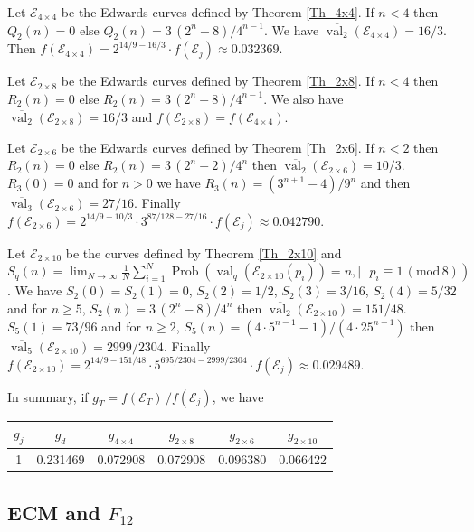 \documentclass[a4paper, 11pt, pdftex]{report}
\theoremstyle{plain}
\theoremstyle{definition}
\newcommand\T{\rule{0pt}{2.6ex}}
\newcommand\B{\rule[-1.4ex]{0pt}{0pt}}
\DeclareMathOperator{\val}{val}
\DeclareMathOperator{\Prob}{Prob}
\begin{document}
Let $\mathcal{E}_{4\times4}$ be the Edwards curves defined by Theorem \ref{Th_4x4}.
If $n < 4$ then $Q_2(n) = 0$ else $Q_2(n) = 3\,(2^n - 8)/4^{n-1}$. We have
$\overline{\val_2}(\mathcal{E}_{4\times4}) = 16/3$. Then $f(\mathcal{E}_{4\times4})
= 2^{14/9 - 16/3}\cdot f(\mathcal{E}_j) \approx 0.032369$.

Let $\mathcal{E}_{2\times8}$ be the Edwards curves defined by Theorem \ref{Th_2x8}.
If $n < 4$ then $R_2(n) = 0$ else $R_2(n) = 3\,(2^n - 8)/4^{n-1}$. We also have
$\overline{\val_2}(\mathcal{E}_{2\times8}) = 16/3$ and
$f(\mathcal{E}_{2\times8}) = f(\mathcal{E}_{4\times4})$.

Let $\mathcal{E}_{2\times6}$ be the Edwards curves defined by Theorem \ref{Th_2x6}.
If $n < 2$ then $R_2(n) = 0$ else $R_2(n) = 3\,(2^n - 2)/4^n$ then
$\overline{\val_2}(\mathcal{E}_{2\times6}) = 10/3$. $R_3(0) = 0$ and for $n > 0$
we have $R_3(n) = (3^{n+1} - 4) / 9^n$ and then $\overline{\val_3}(\mathcal{E}_{2\times6}) = 27/16$.
Finally $f(\mathcal{E}_{2\times6})
= 2^{14/9 - 10/3}\cdot 3^{87/128 - 27/16}\cdot f(\mathcal{E}_j) \approx 0.042790$.

Let $\mathcal{E}_{2\times10}$ be the curves defined by Theorem \ref{Th_2x10} and
$S_q(n) = \lim_{N \to \infty} \frac{1}{N} \sum_{i = 1}^N
\Prob(\val_q(\mathcal{E}_{2\times10}(p_i)) = n, |\text{ } p_i \equiv 1\, (\text{mod}\,8))$.
We have $S_2(0) = S_2(1) = 0$, $S_2(2) = 1/2$, $S_2(3) = 3/16$, $S_2(4) = 5/32$ and
for $n \geq 5$, $S_2(n) = 3\,(2^n - 8)/4^n$ then
$\overline{\val_2}(\mathcal{E}_{2\times10}) = 151/48$. $S_5(1) = 73/96$ and for $n \geq 2$,
$S_5(n) = (4\cdot 5^{n-1} - 1)/(4\cdot 25^{n-1})$ then
$\overline{\val_5}(\mathcal{E}_{2\times10}) = 2999/2304$.
Finally $f(\mathcal{E}_{2\times10})
= 2^{14/9 - 151/48}\cdot 5^{695/2304 - 2999/2304}\cdot f(\mathcal{E}_j) \approx 0.029489$.

In summary, if $g_T = f(\mathcal{E}_T)\, / f(\mathcal{E}_j)$, we have
\begin{center}
\begin{tabular}{|c|c|c|c|c|c|}
\hline 
\B\T $g_j$ & $g_d$ & $g_{4\times4}$ & $g_{2\times8}$ & $g_{2\times6}$ & $g_{2\times10}$ \\ 
\hline 
\B\T 1 & 0.231469 & 0.072908 & 0.072908 & 0.096380 & 0.066422 \\ 
\hline 
\end{tabular} 
\end{center}

\subsection{ECM and $F_{12}$}
\end{document}
